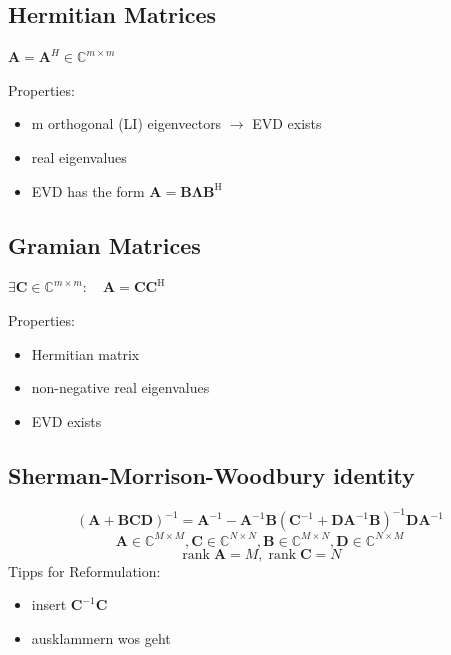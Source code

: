\documentclass[english]{latex4ei/latex4ei_sheet}
\begin{document}
\begin{sectionbox}
  \subsection{Hermitian Matrices}
  \begin{emphbox}
    $\boldsymbol{A}=\boldsymbol{A}^H \in \mathbb{C}^{m\times m}$
  \end{emphbox}
  Properties:
  \begin{itemize}
    \item m orthogonal (LI) eigenvectors $\rightarrow$ EVD exists 
    \item real eigenvalues
    \item EVD has the form $\boldsymbol{A}=\boldsymbol{B} \boldsymbol{\Lambda} \boldsymbol{B}^{\mathrm{H}}$
  \end{itemize}

\end{sectionbox}

\begin{sectionbox}
  \subsection{Gramian Matrices}
  \begin{emphbox}
    $\exists \boldsymbol{C} \in \mathbb{C}^{m \times m}: \quad \boldsymbol{A}=\boldsymbol{C} \boldsymbol{C}^{\mathrm{H}}$
  \end{emphbox}
  Properties:
  \begin{itemize}
    \item Hermitian matrix
    \item non-negative real eigenvalues
    \item EVD exists
  \end{itemize}
\end{sectionbox}

\begin{sectionbox}
  \subsection{Sherman-Morrison-Woodbury identity}
  $$(\boldsymbol{A}+\boldsymbol{B} \boldsymbol{C} \boldsymbol{D})^{-1}=\boldsymbol{A}^{-1}-\boldsymbol{A}^{-1} \boldsymbol{B}\left(\boldsymbol{C}^{-1}+\boldsymbol{D} \boldsymbol{A}^{-1} \boldsymbol{B}\right)^{-1} \boldsymbol{D} \boldsymbol{A}^{-1}$$
  $$\boldsymbol{A} \in \mathbb{C}^{M \times M}, \boldsymbol{C} \in \mathbb{C}^{N \times N}, \boldsymbol{B} \in \mathbb{C}^{M \times N}, \boldsymbol{D} \in \mathbb{C}^{N \times M}$$
  $$\operatorname{rank} \boldsymbol{A}=M, \operatorname{rank} \boldsymbol{C}=N$$
  Tipps for Reformulation:
  \begin{itemize}
    \item insert $\boldsymbol{C}^{-1}\boldsymbol{C}$
    \item ausklammern wos geht
  \end{itemize}
\end{sectionbox}
\end{document}
